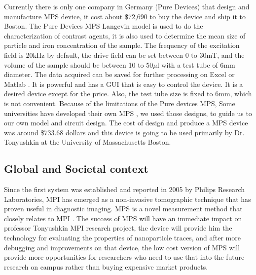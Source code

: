 \documentclass[fleqn,10pt]{document} %
\begin{document}
	Currently there is only one company in Germany (Pure Devices) that design and manufacture MPS device, it cost about \$72,690 to buy the device and ship it to Boston. 
    The Pure Devices MPS Langevin model is used to do the characterization of contrast agents, it is also used to determine the mean size of particle and iron concentration of the sample. The frequency of the excitation field is 20kHz by default, the drive field can be set between 0 to 30mT, and the volume of the sample should be between 10 to 50$\mu$l with a test tube of 6mm diameter. The data acquired can be saved for further processing on Excel or Matlab \cite{p7}. It is powerful and has a GUI that is easy to control the device. It is a desired device except for the price. Also, the test tube size is fixed to 6mm, which is not convenient. Because of the limitations of the Pure devices MPS, Some universities have developed their own MPS \cite{p8}, we used those designs, to guide us to our own model and circuit design.
    The cost of design and produce a MPS device was around \$733.68 dollars and this device is going to be used primarily by Dr. Tonyushkin at the University of Massachusetts Boston.  
    \subsection{Global and Societal context}
    Since the first system was established and reported in 2005 by Philips Research Laboratories, MPI has emerged as a non-invasive tomographic technique that has proven useful in diagnostic imaging. MPS is a novel measurement method that closely relates to MPI \cite{p9} \cite{p10}.  The success of MPS will have an immediate impact on professor Tonyushkin MPI research project, the device will provide him the technology for evaluating the properties of nanoparticle traces,  and after more debugging and improvements on that device, the low cost version of MPS will provide more opportunities for researchers who need to use that into the future research on campus rather than buying expensive market products. 
\end{document}
